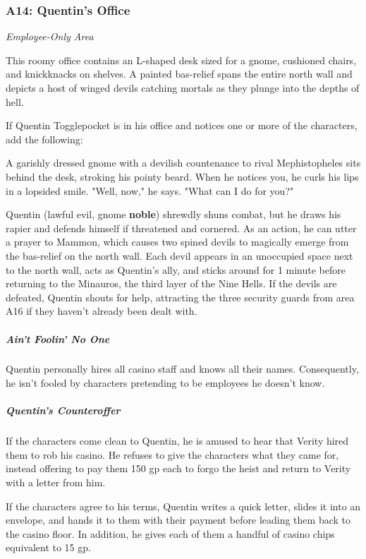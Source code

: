 \documentclass[10pt,a4paper,twoside,bg=print,twocolumn,openany,nodeprecatedcode]{dndbook}
\begin{document}
\subsubsection{A14: Quentin's Office}
\textit{Employee-Only Area}

\begin{DndReadAloud}{}
This roomy office contains an L-shaped desk sized for a gnome, cushioned chairs, and knickknacks on shelves. A painted bas-relief spans the entire north wall and depicts a host of winged devils catching mortals as they plunge into the depths of hell.

\end{DndReadAloud}

If Quentin Togglepocket is in his office and notices one or more of the characters, add the following:

\begin{DndReadAloud}{}
A garishly dressed gnome with a devilish countenance to rival Mephistopheles sits behind the desk, stroking his pointy beard. When he notices you, he curls his lips in a lopsided smile. "Well, now," he says. "What can I do for you?"

\end{DndReadAloud}

Quentin (lawful evil, gnome \textbf{noble}) shrewdly shuns combat, but he draws his rapier and defends himself if threatened and cornered. As an action, he can utter a prayer to Mammon, which causes two spined devils to magically emerge from the bas-relief on the north wall. Each devil appears in an unoccupied space next to the north wall, acts as Quentin's ally, and sticks around for 1 minute before returning to the Minauros, the third layer of the Nine Hells. If the devils are defeated, Quentin shouts for help, attracting the three security guards from area A16 if they haven't already been dealt with.

\subparagraph{Ain't Foolin' No One}
Quentin personally hires all casino staff and knows all their names. Consequently, he isn't fooled by characters pretending to be employees he doesn't know.

\subparagraph{Quentin's Counteroffer}
If the characters come clean to Quentin, he is amused to hear that Verity hired them to rob his casino. He refuses to give the characters what they came for, instead offering to pay them 150 gp each to forgo the heist and return to Verity with a letter from him.

If the characters agree to his terms, Quentin writes a quick letter, slides it into an envelope, and hands it to them with their payment before leading them back to the casino floor. In addition, he gives each of them a handful of casino chips equivalent to 15 gp.
\end{document}
